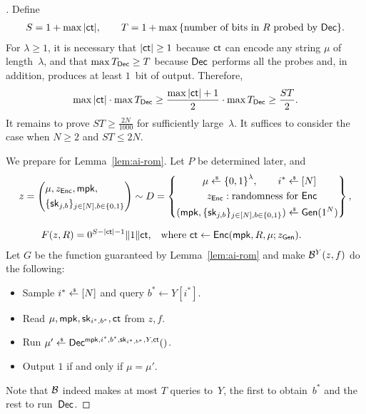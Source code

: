 \begin{proof}[]
Define
\begin{align*}
S=1+\max{|\ct|},\qquad
T=1+\max{\{\textup{number of bits in $R$ probed by $\Dec$}\}}.
\end{align*}
For ${\lambda\geq 1}$, it is necessary
that ${|\ct|\geq 1}$ because $\ct$ can encode any string $\mu$ of length~$\lambda$, and
that ${\max{\TDec}\geq T}$ because $\Dec$ performs all the probes and, in addition, produces at least $1$~bit of output.
Therefore,
\begin{align*}
\max{|\ct|}\cdot\max{\TDec}
\geq\frac{\max{|\ct|}+1}{2}\cdot\max{\TDec}
\geq\frac{ST}{2}.
\end{align*}
It remains to prove ${ST\geq\frac{2N}{1000}}$ for sufficiently large~$\lambda$.
It suffices to consider the case when ${N\geq 2}$ and ${ST\leq 2N}$.

We prepare for Lemma~\ref{lem:ai-rom}.
Let $P$ be determined later, and
\begin{align*}
z&{}=\left(\begin{aligned}
&\mu,z_\Enc,\mpk,\\
&\{\sk_{j,b}\}_{j\in[N],b\in\bit}
\end{aligned}\right)\sim D=
\left\{\begin{aligned}
\mu\draws\bit^\lambda,\qquad
i^\ast\draws{}&[N]\\
z_\Enc:\textup{randomness for }&\Enc\\
(\mpk,\{\sk_{j,b}\}_{j\in[N],b\in\bit})\draws{}&\Gen(1^N)
\end{aligned}\right\},\\
\rule[1.5em]{0pt}{0pt}
F(z,R)
\hspace*{-5em}&\hspace*{5em}
{}=0^{S-|\ct|-1}\concat 1\concat\ct\textup{,\quad where }
\ct\gets\Enc(\mpk,R,\mu;z_\Gen).
\end{align*}
Let $G$ be the function guaranteed by Lemma~\ref{lem:ai-rom} and make
${\mathcal{B}}^Y(z,f)$ do the following:
\begin{itemize}
\item Sample ${i^\ast\draws[N]}$ and query ${b^\ast\gets Y[i^\ast]}$.
\item Read $\mu,\mpk,\sk_{i^\ast,b^\ast},\ct$ from $z,f$.
\item Run ${\mu'\draws\Dec^{\mpk,i^\ast,b^\ast,\sk_{i^\ast,b^\ast},Y,\ct}()}$.
\item Output $1$ if and only if ${\mu=\mu'}$.
\end{itemize}
Note that ${\mathcal{B}}$ indeed makes at most $T$ queries to~$Y$,
the first to obtain~$b^\ast$ and the rest to run~$\Dec$.


\end{proof}
